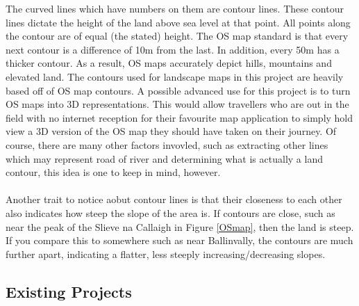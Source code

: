 \documentclass[11pt]{article}
\begin{document}
The curved lines which have numbers on them are contour lines. These contour
lines dictate the height of the land above sea level at that point. All points
along the contour are of equal (the stated) height. The OS map standard is 
that every next contour is a difference of 10m from the last. In addition, every 
50m has a thicker contour. As a result, OS maps accurately depict hills, mountains
and elevated land. The contours used for landscape maps in this project are 
heavily based off of OS map contours. A possible advanced use for this project
is to turn OS maps into 3D representations. This would allow travellers who are
out in the field with no internet reception for their favourite map application to
simply hold view a 3D version of the OS map they should have taken on their journey.
Of course, there are many other factors invovled, such as extracting other lines
which may represent road of river and determining what is actually a land contour, 
this idea is one to keep in mind, however.\\
\\
Another trait to notice aobut contour lines is that their closeness to each other
also indicates how steep the slope of the area is. If contours are close, such as
near the peak of the Slieve	na Callaigh in Figure \ref{OSmap}, then the land is 
steep. If you compare this to somewhere such as near Ballinvally, the contours 
are much further apart, indicating a flatter, less steeply increasing/decreasing 
slopes. 

\subsection{Existing Projects}
\end{document}
